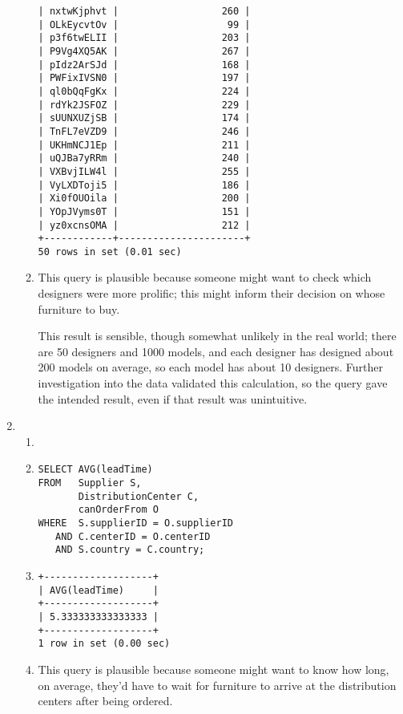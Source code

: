 \documentclass[american,extrafontsizes,12pt,portrait,letterpaper,oneside,onecolumn,article,final]{memoir}
\begin{document}
\begin{enumerate}[leftmargin=*,label={\strong{\uline{(\emph{\Alph*})}}}]
\begin{enumerate}[leftmargin=*,widest={\strong{Explanation:}}]
\begin{verbatim}
| nxtwKjphvt |                  260 |
| OLkEycvtOv |                   99 |
| p3f6twELII |                  203 |
| P9Vg4XQ5AK |                  267 |
| pIdz2ArSJd |                  168 |
| PWFixIVSN0 |                  197 |
| ql0bQqFgKx |                  224 |
| rdYk2JSFOZ |                  229 |
| sUUNXUZjSB |                  174 |
| TnFL7eVZD9 |                  246 |
| UKHmNCJ1Ep |                  211 |
| uQJBa7yRRm |                  240 |
| VXBvjILW4l |                  255 |
| VyLXDToji5 |                  186 |
| Xi0fOUOila |                  200 |
| YOpJVyms0T |                  151 |
| yz0xcnsOMA |                  212 |
+------------+----------------------+
50 rows in set (0.01 sec)
\end{verbatim}
\item[\strong{Explanation:}] This query is plausible because someone might want to check which designers were more prolific; this might inform their decision on whose furniture to buy.

This result is sensible, though somewhat unlikely in the real world; there are 50 designers and 1000 models, and each designer has designed about 200 models on average, so each model has about 10 designers.
Further investigation into the data validated this calculation, so the query gave the intended result, even if that result was unintuitive.
\end{enumerate}

\item
\begin{enumerate}[leftmargin=*,widest={\strong{Explanation:}}]
\item[\strong{Intent:}] 
\item[\strong{Query:}]
\begin{verbatim}
SELECT AVG(leadTime)
FROM   Supplier S,
       DistributionCenter C,
       canOrderFrom O
WHERE  S.supplierID = O.supplierID
   AND C.centerID = O.centerID
   AND S.country = C.country;
\end{verbatim}
\item[\strong{Result:}]
\begin{verbatim}
+-------------------+
| AVG(leadTime)     |
+-------------------+
| 5.333333333333333 |
+-------------------+
1 row in set (0.00 sec)
\end{verbatim}
\item[\strong{Explanation:}] This query is plausible because someone might want to know how long, on average, they'd have to wait for furniture to arrive at the distribution centers after being ordered.


\end{enumerate}
\end{enumerate}
\end{document}
